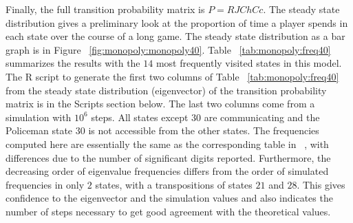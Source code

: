 \documentclass[12pt]{article}
\begin{document}
Finally, the full transition probability matrix is \( P = R J \mathit{Ch}
\mathit{Cc} \).  The steady state distribution gives a preliminary look
at the proportion of time a player spends in each state over the course
of a long game.  The steady state distribution as a bar graph is in
Figure~%
\ref{fig:monopoly:monopoly40}.  Table~%
\ref{tab:monopoly:freq40} summarizes the results with the \( 14 \) most
frequently visited states in this model.  The R script to generate the
first two columns of Table~%
\ref{tab:monopoly:freq40} from the steady state distribution (eigenvector)
of the transition probability matrix is in the Scripts section below.
The last two columns come from a simulation with \( 10^6 \) steps.  All
states except \( 30 \) are communicating and the Policeman state \( 30 \)
is not accessible from the other states.  The frequencies computed here
are essentially the same as the corresponding table in~%
\cite{abbott97}, with differences due to the number of significant
digits reported.  Furthermore, the decreasing order of eigenvalue
frequencies differs from the order of simulated frequencies in only \( 2
\) states, with a transpositions of states \( 21 \) and \( 28 \).  This
gives confidence to the eigenvector and the simulation values and also
indicates the number of steps necessary to get good agreement with the
theoretical values.
\end{document}

